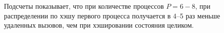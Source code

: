 \documentclass[12pt,a4paper,fleqn]{article}
\newcommand{\Code}[1]{\textbf{\mbox{#1}}}
\begin{document}
Подсчеты показывает, что при количестве процессов $P = 6-8$, при распределении по хэшу
первого процесса получается в 4--5 раз меньше удаленных вызовов, чем при хэшировании
состояния целиком.








\end{document}
